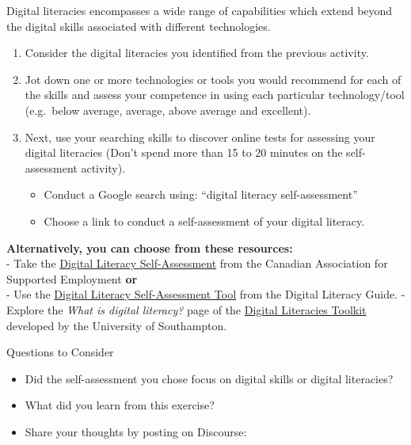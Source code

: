 \documentclass[
]{book}
\providecommand{\tightlist}{%
  \setlength{\itemsep}{0pt}\setlength{\parskip}{0pt}}
\theoremstyle{definition}
\theoremstyle{definition}
\theoremstyle{definition}
\theoremstyle{definition}
\theoremstyle{remark}
\begin{document}
\begin{reflect}
Digital literacies encompasses a wide range of capabilities which extend beyond the digital skills associated with different technologies.

\begin{enumerate}
\def\labelenumi{\arabic{enumi}.}
\tightlist
\item
  Consider the digital literacies you identified from the previous activity.\\
\item
  Jot down one or more technologies or tools you would recommend for each of the skills and assess your competence in using each particular technology/tool (e.g.~below average, average, above average and excellent).\\
\item
  Next, use your searching skills to discover online tests for assessing your digital literacies (Don't spend more than 15 to 20 minutes on the self-assessment activity).

  \begin{itemize}
  \tightlist
  \item
    Conduct a Google search using: ``digital literacy self-assessment''\\
  \item
    Choose a link to conduct a self-assessment of your digital literacy.
  \end{itemize}
\end{enumerate}

\textbf{Alternatively, you can choose from these resources:}\\
- Take the \href{https://www.supportedemployment.ca/digital-literacy/digital-literacy-self-assessment/}{Digital Literacy Self-Assessment} from the Canadian Association for Supported Employment \textbf{or}\\
- Use the \href{https://thinkspace.csu.edu.au/digitalcitizenshipguideetl523/}{Digital Literacy Self-Assessment Tool} from the Digital Literacy Guide.
- Explore the \emph{What is digital literacy?} page of the \href{https://www.elanguages.ac.uk/digital_literacies_toolkit.php}{Digital Literacies Toolkit} developed by the University of Southampton.

{Questions to Consider}

\begin{itemize}
\tightlist
\item
  Did the self-assessment you chose focus on digital skills or digital literacies?
\item
  What did you learn from this exercise?
\item
  Share your thoughts by posting on Discourse:
\end{itemize}
\end{reflect}
\end{document}
